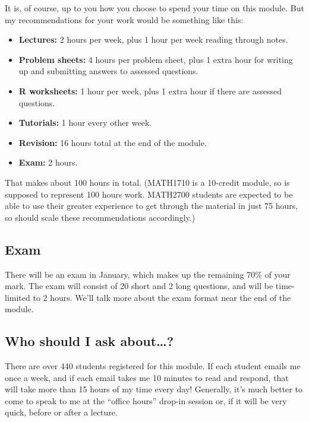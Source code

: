 \documentclass[
  a4paper,
]{book}
\providecommand{\tightlist}{%
  \setlength{\itemsep}{0pt}\setlength{\parskip}{0pt}}
\theoremstyle{definition}
\theoremstyle{definition}
\theoremstyle{definition}
\theoremstyle{definition}
\theoremstyle{remark}
\begin{document}
It is, of course, up to you how you choose to spend your time on this module. But my recommendations for your work would be something like this:

\begin{itemize}
\tightlist
\item
  \textbf{Lectures:} 2 hours per week, plus 1 hour per week reading through notes.
\item
  \textbf{Problem sheets:} 4 hours per problem sheet, plus 1 extra hour for writing up and submitting answers to assessed questions.
\item
  \textbf{R worksheets:} 1 hour per week, plus 1 extra hour if there are assessed questions.
\item
  \textbf{Tutorials:} 1 hour every other week.
\item
  \textbf{Revision:} 16 hours total at the end of the module.
\item
  \textbf{Exam:} 2 hours.
\end{itemize}

That makes about 100 hours in total. (MATH1710 is a 10-credit module, so is supposed to represent 100 hours work. MATH2700 students are expected to be able to use their greater experience to get through the material in just 75 hours, so should scale these recommendations accordingly.)

\hypertarget{exam}{%
\subsection*{Exam}\label{exam}}

There will be an exam in January, which makes up the remaining 70\% of your mark. The exam will consist of 20 short and 2 long questions, and will be time-limited to 2 hours. We'll talk more about the exam format near the end of the module.

\hypertarget{ask}{%
\subsection*{Who should I ask about\ldots?}\label{ask}}

There are over 440 students registered for this module. If each student emails me once a week, and if each email takes me 10 minutes to read and respond, that will take more than 15 hours of my time every day! Generally, it's much better to come to speak to me at the ``office hours'' drop-in session or, if it will be very quick, before or after a lecture.
\end{document}
